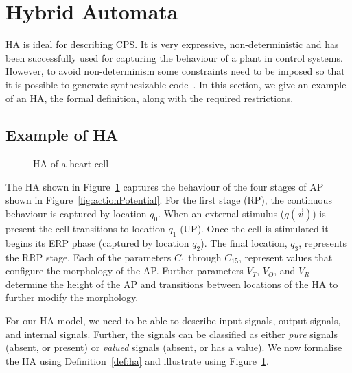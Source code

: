 \section{Hybrid Automata}
\label{sec:HA}



\acf{HA} is ideal for describing 
\ac{CPS}. It is very expressive, non-deterministic  
and has been successfully used for 
capturing the behaviour of a plant in control systems.
However, to avoid non-determinism 
some constraints need to be imposed so that it is possible to  
generate synthesizable code~\cite{Lee2014}. 
In this section, we give an example of an \ac{HA}, the formal definition, along with the required restrictions.



\subsection{Example of \acf{HA} }

\begin{figure}
\centering

\caption{\acf{HA} of a heart cell \label{fig:heartCellHA}}
\end{figure}

The HA shown in Figure~\ref{fig:heartCellHA} captures the behaviour of the four stages of \ac{AP} shown in Figure~\ref{fig:actionPotential}.
For the first stage (\ac{RP}), the continuous behaviour is captured by location $q_0$.
When an external stimulus ($g(\vec{v})$) is present the cell transitions to location $q_1$ (\ac{UP}).
Once the cell is stimulated it begins its \ac{ERP} phase (captured by location $q_2$).
The final location, $q_3$, represents the \ac{RRP} stage.
Each of the parameters $C_1$ through $C_{15}$, represent values that configure the morphology of the \ac{AP}.
Further parameters $V_T$, $V_O$, and $V_R$ determine the height of the \ac{AP} and transitions between locations of the \ac{HA} to further modify the morphology.

For our \ac{HA} model, we need to be able to 
describe  input signals, 
output signals, 
and internal signals. 
Further,
the signals can be classified as either 
\emph{pure} signals (absent, or present) or
\emph{valued} signals (absent, or has a value).
We now formalise
the \ac{HA} using Definition~\ref{def:ha} 
and illustrate using Figure~\ref{fig:heartCellHA}.\newline




